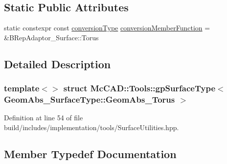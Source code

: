 \subsection*{Static Public Attributes}
\begin{DoxyCompactItemize}
\item 
static constexpr const \hyperlink{structMcCAD_1_1Tools_1_1gpSurfaceType_3_01GeomAbs__SurfaceType_1_1GeomAbs__Torus_01_4_ad997fa3fbe5435cad71d40231540a40e}{conversion\+Type} \hyperlink{structMcCAD_1_1Tools_1_1gpSurfaceType_3_01GeomAbs__SurfaceType_1_1GeomAbs__Torus_01_4_a036a4a3be85f8b7b14b8af2a02982000}{conversion\+Member\+Function} = \&B\+Rep\+Adaptor\+\_\+\+Surface\+::\+Torus
\end{DoxyCompactItemize}


\subsection{Detailed Description}
\subsubsection*{template$<$$>$\newline
struct Mc\+C\+A\+D\+::\+Tools\+::gp\+Surface\+Type$<$ Geom\+Abs\+\_\+\+Surface\+Type\+::\+Geom\+Abs\+\_\+\+Torus $>$}



Definition at line 54 of file build/includes/implementation/tools/\+Surface\+Utilities.\+hpp.



\subsection{Member Typedef Documentation}
\mbox{\label{structMcCAD_1_1Tools_1_1gpSurfaceType_3_01GeomAbs__SurfaceType_1_1GeomAbs__Torus_01_4_ad997fa3fbe5435cad71d40231540a40e}} 
